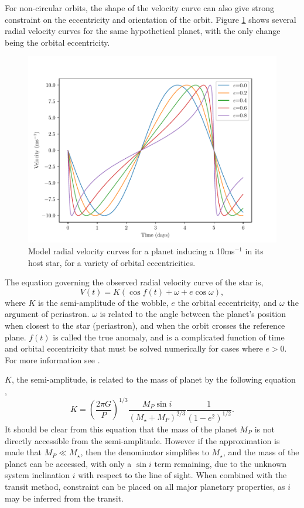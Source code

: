 For non-circular orbits, the shape of the velocity curve can also give strong constraint on the eccentricity and orientation of the orbit. Figure \ref{fig:rv_model} shows several radial velocity curves for the same hypothetical planet, with the only change being the orbital eccentricity. 
\begin{figure}[H]
\centering
\includegraphics[width=\columnwidth]{RV.pdf}
\caption{Model radial velocity curves for a planet inducing a 10ms$^{-1}$ in its host star, for a variety of orbital eccentricities.}
\label{fig:rv_model}
\end{figure}

The equation governing the observed radial velocity curve of the star is,
\begin{equation}
V(t)=K(\cos{f(t)+\omega} + e\cos{\omega}), 
\label{eq:doppler}
\end{equation}
where $K$ is the semi-amplitude of the wobble, $e$ the orbital eccentricity, and $\omega$ the argument of periastron. $\omega$ is related to the angle between the planet's position  when closest to the star (periastron), and when the orbit crosses the reference plane. $f(t)$ is called the true anomaly, and is a complicated function of time and orbital eccentricity that must be solved numerically for cases where $e>0$. 
For more information see \citet[Ch. 2]{2011Perryman_book}. 

$K$, the semi-amplitude, is related to the mass of planet by the following equation \citet[Eq. 1]{1999Cumming},
\begin{equation}
K=\left(\frac{2\pi G}{P}\right)^{1/3} \frac{M_{P} \sin{i}}{(M_{\star}+M_{P})^{2/3}} \frac{1}{(1-e^2)^{1/2}}.
\label{eq:k_amp}
\end{equation}
It should be clear from this equation that the mass of the planet $M_{P}$ is not directly accessible from the semi-amplitude. However if the approximation is made that $M_{P}\ll M_{\star}$, then the denominator simplifies to $M_{\star}$, and the mass of the planet can be accessed, with only a $\sin{i}$ term remaining, due to the unknown system inclination $i$ with respect to the line of sight. When combined with the transit method, constraint can be placed on all major planetary properties, as $i$ may be inferred from the transit.  
